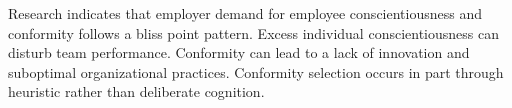 \documentclass[review]{elsarticle}
\begin{document}



Research indicates that employer demand for employee conscientiousness and conformity follows a bliss point pattern.
Excess individual conscientiousness can disturb team performance\cite{curcseu2019personality}.
Conformity can lead to a lack of innovation and suboptimal organizational practices\cite{symon2006neglected}.
Conformity selection occurs in part through heuristic rather than deliberate cognition.

\end{document}
